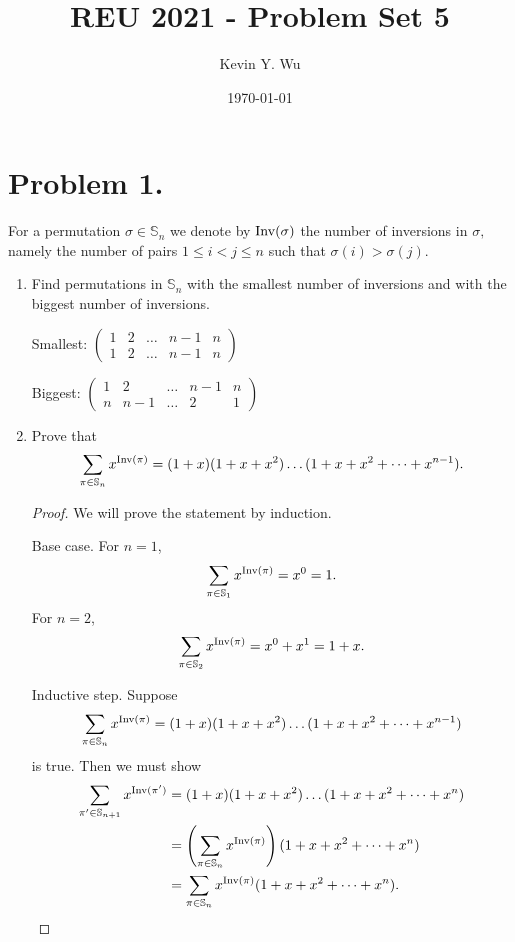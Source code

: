\documentclass{article}
\title{REU 2021 - Problem Set 5}
\author{Kevin Y. Wu}
\date{\today}
\begin{document}
\maketitle

\tableofcontents
\newpage
{}


\section{Problem 1.}
For a permutation $\sigma\in \mathbb{S}_n$ we denote by $\textup{Inv}(\sigma)$ the number of inversions in $\sigma,$ namely the number of pairs $1\leq i<j\leq n$ such that $\sigma(i)>\sigma(j).$
\begin{enumerate}[label=(\alph*)]
    \item Find permutations in $\mathbb{S}_n$ with the smallest number of inversions and with the biggest number of inversions. 
    \par Smallest:
    $\begin{pmatrix}
    1 & 2 & \dots & n-1 & n\\
    1 & 2 & \dots & n-1 & n
    \end{pmatrix}$
    \par Biggest:
    $\begin{pmatrix}
    1 & 2 & \dots & n-1 & n\\
    n & n-1 & \dots & 2 & 1
    \end{pmatrix}$
    \item Prove that 
    \[\sum_{\pi \in \mathbb{S}_n} x^{\textup{Inv}(\pi)}=(1+x)(1+x+x^2)\dots (1+x+x^2+\dots+x^{n-1}).\]
    \begin{proof}
    We will prove the statement by induction.
    \par Base case. For $n=1$, 
    \[\sum_{\pi \in \mathbb{S}_1} x^{\textup{Inv}(\pi)}=x^0=1.\]
    For $n=2$, 
    \[\sum_{\pi \in \mathbb{S}_2} x^{\textup{Inv}(\pi)}=x^0+x^1=1+x.\]
    \par Inductive step. Suppose 
    \[\sum_{\pi \in \mathbb{S}_n} x^{\textup{Inv}(\pi)}=(1+x)(1+x+x^2)\dots (1+x+x^2+\dots+x^{n-1})\]
    is true. Then we must show
    \begin{align*}
        \sum_{\pi' \in \mathbb{S}_{n+1}} x^{\textup{Inv}(\pi')}
        &=(1+x)(1+x+x^2)\dots (1+x+x^2+\dots+x^{n})\\
        &=\left (\sum_{\pi \in \mathbb{S}_n} x^{\textup{Inv}(\pi)}\right )(1+x+x^2+\dots+x^{n})\\
        &=\sum_{\pi \in \mathbb{S}_n} x^{\textup{Inv}(\pi)}(1+x+x^2+\dots+x^{n}).

\end{align*}
\end{proof}
\end{enumerate}
\end{document}
